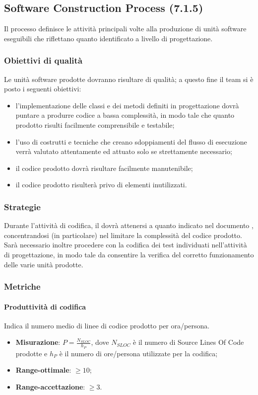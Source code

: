 \subsection{Software Construction Process (7.1.5)}
\label{soConstruction}
Il processo definisce le attività principali volte alla produzione di unità software eseguibili che riflettano quanto identificato a livello di progettazione.
\subsubsection{Obiettivi di qualità}
Le unità software prodotte dovranno risultare di qualità; a questo fine il team si è posto i seguenti obiettivi:
\begin{itemize}
\item l'implementazione delle classi e dei metodi definiti in progettazione dovrà puntare a produrre codice a bassa complessità, in modo tale che quanto prodotto risulti facilmente comprensibile e testabile;
\item l'uso di costrutti e tecniche che creano sdoppiamenti del flusso di esecuzione verrà valutato attentamente ed attuato solo se strettamente necessario;
\item il codice prodotto dovrà risultare facilmente manutenibile;
\item il codice prodotto risulterà privo di elementi inutilizzati.
\end{itemize}
\subsubsection{Strategie}
Durante l'attività di codifica, il \textit{\Progr} dovrà attenersi a quanto indicato nel documento \textit{\DDP}, concentrandosi (in particolare) nel limitare la complessità del codice prodotto.\\
Sarà necessario inoltre procedere con la codifica dei test individuati nell'attività di progettazione, in modo tale da consentire la verifica del corretto funzionamento delle varie unità prodotte.
\subsubsection{Metriche}
\paragraph{Produttività di codifica}
\label{prodCod}
Indica il numero medio di linee di codice prodotto per ora/persona.
\begin{itemize}
\item \textbf{Misurazione}: $P=\frac{N_{SLOC}}{h_{P}}$, dove $N_{SLOC}$ è il numero di Source Lines Of Code prodotte e $h_{P}$ è il numero di ore/persona utilizzate per la codifica;
\item \textbf{Range-ottimale}: $\geq 10$;
\item \textbf{Range-accettazione}: $\geq 3$.
\end{itemize}
